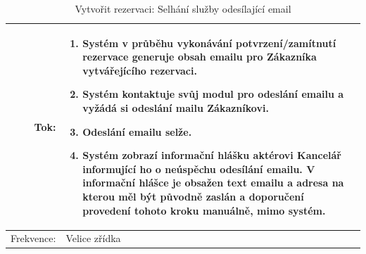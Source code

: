 \documentclass[a4paper,10pt]{article}
\begin{document}
\begin{center}
\begin{table}[ht!]
{\begin{tabular}{| r | p{12cm} |}
    \hline
    Tok: & 
    \begin{minipage}[t]{0.75\textwidth}
    	\begin{enumerate}[nosep,after=\strut]
            \item Systém v průběhu vykonávání potvrzení/zamítnutí rezervace generuje obsah emailu pro Zákazníka vytvářejícího rezervaci.
            \item Systém kontaktuje svůj modul pro odeslání emailu a vyžádá si odeslání mailu Zákazníkovi.
            \item Odeslání emailu selže.
            \item Systém zobrazí informační hlášku aktérovi Kancelář informující ho o neúspěchu odesílání emailu. V informační hlášce je obsažen text emailu a adresa na kterou měl být původně zaslán a doporučení provedení tohoto kroku manuálně, mimo systém.
    	\end{enumerate}
  	\end{minipage} \\
    \hline
    Frekvence: & Velice zřídka \\
    \hline

\end{tabular}}
\caption{Vytvořit rezervaci: Selhání služby odesílající email}
\label{table:4}
\end{table}
\end{center}
\end{document}
